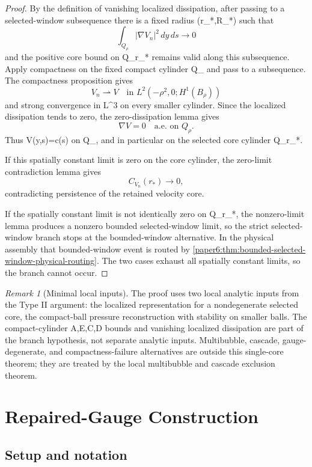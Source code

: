 \documentclass[11pt]{amsart}
\def\({}%
\def\){}%
\theoremstyle{plain}
\theoremstyle{definition}
\theoremstyle{remark}
\newtheorem{remark}[remark]{Remark}
\begin{document}
\begin{proof}
By the definition of vanishing localized dissipation, after passing to a
selected-window subsequence there is a fixed radius \(\rho\in(r_*,R_*)\) such
that
\[
  \int_{Q_\rho}|\nabla V_n|^2\,dy\,ds\to0
\]
and the positive core bound on \(Q_{r_*}\) remains valid along this subsequence.
Apply compactness on the fixed compact
cylinder \(Q_\rho\) and pass to a subsequence.  The compactness proposition
gives
\[
  V_n\rightharpoonup V\quad\text{in }L^2(-\rho^2,0;H^1(B_\rho))
\]
and strong convergence in \(L^3\) on every smaller cylinder.  Since the
localized dissipation tends to zero, the zero-dissipation lemma gives
\[
  \nabla V=0\quad\text{a.e. on }Q_\rho.
\]
Thus \(V(y,s)=c(s)\) on \(Q_\rho\), and in particular on the selected core
cylinder \(Q_{r_*}\).

If this spatially constant limit is zero on the core cylinder, the zero-limit
contradiction lemma gives
\[
  C_{V_n}(r_*)\to0,
\]
contradicting persistence of the retained velocity core.

If the spatially constant limit is not identically zero on \(Q_{r_*}\), the
nonzero-limit lemma produces a nonzero bounded selected-window limit, so the
strict selected-window branch stops at the bounded-window alternative.  In the
physical assembly that bounded-window event is routed by
\cref{paper6:thm:bounded-selected-window-physical-routing}.  The two cases exhaust all
spatially constant limits, so the branch cannot occur.
\end{proof}

\begin{remark}[Minimal local inputs]
The proof uses two local analytic inputs from the Type II argument: the
localized representation for a nondegenerate selected core, the compact-ball
pressure reconstruction with stability on smaller balls.  The
compact-cylinder \(A,E,C,D\) bounds and vanishing localized dissipation are
part of the branch hypothesis, not separate analytic inputs.  Multibubble,
cascade, gauge-degenerate, and compactness-failure alternatives are outside
this single-core theorem; they are treated by the local multibubble and
cascade exclusion theorem.
\end{remark}

\clearpage
\section{Repaired-Gauge Construction}\label{sec:repaired-gauge-construction}
\subsection{Setup and notation}\label{paper2:sec:setup-notation}
\end{document}
